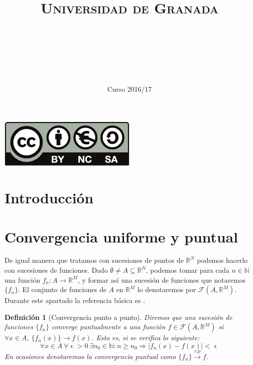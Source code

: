 \documentclass[11pt, a4paper]{article}
\title{
  \normalfont \normalsize 
  \textsc{Universidad de Granada} \\ [25pt]    %
  \horrule{0.5pt} \\[0.4cm] %
  \huge \sffamily\subject\\ %
  \horrule{2pt} \\[0.5cm] %
}
\author{\Large\sffamily{\docauthor}}
\date{\vspace{-1.5em} \normalsize \sffamily Curso 2016/17}
\newif\IfInSansMode
\let\epsilon\upvarepsilon
\newcommand{\R}{\mathbb{R}} \newcommand{\N}{\mathbb{N}}
\newcommand{\fn}{\{f_n\}}
\theoremstyle{theorem-style}
\theoremstyle{definition-style}
\newtheorem{ndef}{Definición}[section]
\theoremstyle{remark-style}
\theoremstyle{example-style}
\begin{document}
\maketitle  %
\vfill
\begin{center}
  \includegraphics{by-nc-sa.pdf}  %
\end{center}
\newpage
\tableofcontents    %
\newpage



\section*{Introducción}


\newpage


\section{Convergencia uniforme y puntual}
De igual manera que tratamos con sucesiones de puntos de $\R^N$ podemos hacerlo con sucesiones de funciones. Dado $\emptyset \ne A \subseteq \R^N$, podemos tomar para cada $n \in \mathbb{N}$ una función $f_n : A \to \R^M$, y formar así una sucesión de funciones que notaremos $\{f_n\}$. El conjunto de funciones de $A$ en $\mathbb{R}^M$ lo denotaremos por $\mathcal{F}(A,\mathbb{R}^M)$. Durante este apartado la referencia básica es \cite[Capítulo 5]{marsden}.

\begin{ndef}[Convergencia punto a punto] Diremos que una sucesión de funciones $\fn$ \textit{converge puntualmente} a una función $f\in \mathcal{F}(A,\mathbb{R}^M)$ si $\forall x \in A, \ \{f_n(x)\} \rightarrow f(x)$. Esto es, si se verifica lo siguiente:
  \[
    \forall x\in A\ \forall \epsilon > 0\ \exists n_0 \in \mathbb{N}: n \ge n_0 \Rightarrow |f_n(x)-f(x)| < \epsilon 
  \]
  En ocasiones denotaremos la convergencia puntual como $\fn \xrightarrow {c.p} f$. 
\end{ndef}
\end{document}
